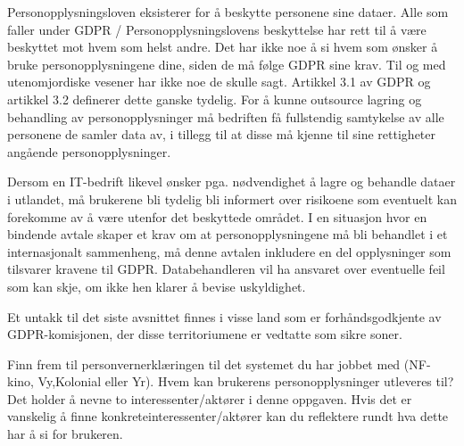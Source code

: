 \documentclass{../../myassignment}
\begin{document}
	\begin{answer}
		Personopplysningsloven eksisterer for å beskytte personene sine dataer. Alle som faller under GDPR / Personopplysningslovens beskyttelse har rett til å være beskyttet mot hvem som helst andre. Det har ikke noe å si hvem som ønsker å bruke personopplysningene dine, siden de må følge GDPR sine krav. Til og med utenomjordiske vesener har ikke noe de skulle sagt. Artikkel 3.1 av GDPR og artikkel 3.2 definerer dette ganske tydelig. For å kunne outsource lagring og behandling av personopplysninger må bedriften få fullstendig samtykelse av alle personene de samler data av, i tillegg til at disse må kjenne til sine rettigheter angående personopplysninger.

		Dersom en IT-bedrift likevel ønsker pga. nødvendighet å lagre og behandle dataer i utlandet, må brukerene bli tydelig bli informert over risikoene som eventuelt kan forekomme av å være utenfor det beskyttede området. I en situasjon hvor en bindende avtale skaper et krav om at personopplysningene må bli behandlet i et internasjonalt sammenheng, må denne avtalen inkludere en del opplysninger som tilsvarer kravene til GDPR. Databehandleren vil ha ansvaret over eventuelle feil som kan skje, om ikke hen klarer å bevise uskyldighet. 

		Et untakk til det siste avsnittet finnes i visse land som er forhåndsgodkjente av GDPR-komisjonen, der disse territoriumene er vedtatte som sikre soner.

	\end{answer}

	\begin{problem}
		Finn frem til personvernerklæringen til det systemet du har jobbet med (NF-kino, Vy,Kolonial eller Yr). Hvem kan brukerens personopplysninger utleveres til? Det holder å nevne to interessenter/aktører i denne oppgaven. Hvis det er vanskelig å finne konkreteinteressenter/aktører kan du reflektere rundt hva dette har å si for brukeren.
	\end{problem}
\end{document}
